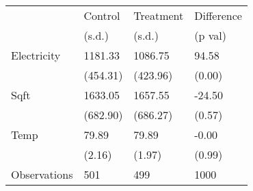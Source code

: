 \begin{tabular}{llll}
\toprule
{} &   Control & Treatment & Difference \\
{} &    (s.d.) &    (s.d.) &    (p val) \\
\midrule
Electricity  &   1181.33 &   1086.75 &      94.58 \\
             &  (454.31) &  (423.96) &     (0.00) \\
Sqft         &   1633.05 &   1657.55 &     -24.50 \\
             &  (682.90) &  (686.27) &     (0.57) \\
Temp         &     79.89 &     79.89 &      -0.00 \\
             &    (2.16) &    (1.97) &     (0.99) \\
Observations &       501 &       499 &       1000 \\
\bottomrule
\end{tabular}
